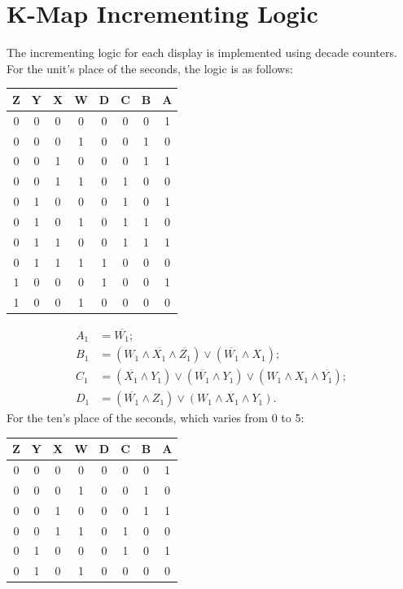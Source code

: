 \documentclass[conference]{IEEEtran}
\begin{document}
\section{K-Map Incrementing Logic}
The incrementing logic for each display is implemented using decade counters. For the unit's place of the seconds, the logic is as follows:
\begin{table}[ht]
\centering
\begin{tabular}{|c|c|c|c|c|c|c|c|}
\hline
Z & Y & X & W & D & C & B & A \\ 
\hline
0 & 0 & 0 & 0 & 0 & 0 & 0 & 1 \\
0 & 0 & 0 & 1 & 0 & 0 & 1 & 0 \\
0 & 0 & 1 & 0 & 0 & 0 & 1 & 1 \\
0 & 0 & 1 & 1 & 0 & 1 & 0 & 0 \\
0 & 1 & 0 & 0 & 0 & 1 & 0 & 1 \\
0 & 1 & 0 & 1 & 0 & 1 & 1 & 0 \\
0 & 1 & 1 & 0 & 0 & 1 & 1 & 1 \\
0 & 1 & 1 & 1 & 1 & 0 & 0 & 0 \\
1 & 0 & 0 & 0 & 1 & 0 & 0 & 1 \\
1 & 0 & 0 & 1 & 0 & 0 & 0 & 0 \\
\hline
\end{tabular}
\end{table}

\begin{align}
    A_1 &= \overline{W_1}; \\
    B_1 &= (W_1 \land \overline{X_1} \land \overline{Z_1}) \lor (\overline{W_1} \land X_1);\\
    C_1 &= (\overline{X_1} \land Y_1) \lor (\overline{W_1} \land Y_1) \lor (W_1 \land X_1 \land \overline{Y_1});\\
    D_1 &= (\overline{W_1} \land Z_1) \lor (W_1 \land X_1 \land Y_1).
\end{align}
For the ten's place of the seconds, which varies from 0 to 5:
\begin{table}[ht]
\centering
\begin{tabular}{|c|c|c|c|c|c|c|c|}
\hline
Z & Y & X & W & D & C & B & A \\ 
\hline
0 & 0 & 0 & 0 & 0 & 0 & 0 & 1 \\
0 & 0 & 0 & 1 & 0 & 0 & 1 & 0 \\
0 & 0 & 1 & 0 & 0 & 0 & 1 & 1 \\
0 & 0 & 1 & 1 & 0 & 1 & 0 & 0 \\
0 & 1 & 0 & 0 & 0 & 1 & 0 & 1 \\
0 & 1 & 0 & 1 & 0 & 0 & 0 & 0 \\
\hline
\end{tabular}
\end{table}
\end{document}
